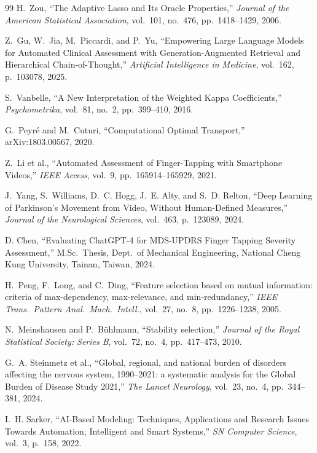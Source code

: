 \documentclass[conference]{IEEEtran}
\begin{document}
\begin{thebibliography}{99}
H.~Zou,
``The Adaptive Lasso and Its Oracle Properties,''
\textit{Journal of the American Statistical Association},
vol.~101, no.~476, pp.~1418--1429, 2006.

Z.~Gu, W.~Jia, M.~Piccardi, and P.~Yu,
``Empowering Large Language Models for Automated Clinical Assessment
with Generation-Augmented Retrieval and Hierarchical Chain-of-Thought,''
\textit{Artificial Intelligence in Medicine}, vol.~162, p.~103078, 2025.

S.~Vanbelle,
``A New Interpretation of the Weighted Kappa Coefficients,''
\textit{Psychometrika}, vol.~81, no.~2, pp.~399--410, 2016.

G.~Peyr\'{e} and M.~Cuturi,
``Computational Optimal Transport,''
arXiv:1803.00567, 2020.

Z.~Li et al.,
``Automated Assessment of Finger-Tapping with Smartphone Videos,''
\textit{IEEE Access}, vol.~9, pp.~165914--165929, 2021.

J.~Yang, S.~Williams, D.~C. Hogg, J.~E. Alty, and S.~D. Relton,
``Deep Learning of Parkinson's Movement from Video, Without
Human-Defined Measures,''
\textit{Journal of the Neurological Sciences}, vol.~463, p.~123089, 2024.

D. Chen,
``Evaluating ChatGPT-4 for MDS-UPDRS Finger Tapping Severity Assessment,''
M.Sc.\ Thesis, Dept.\ of Mechanical Engineering,
National Cheng Kung University, Tainan, Taiwan, 2024.

H.~Peng, F.~Long, and C.~Ding,
``Feature selection based on mutual information: criteria of max-dependency,
max-relevance, and min-redundancy,''
\textit{IEEE Trans.\ Pattern Anal.\ Mach.\ Intell.}, vol.~27, no.~8,
pp.~1226--1238, 2005.

N.~Meinshausen and P.~B\"{u}hlmann,
``Stability selection,''
\textit{Journal of the Royal Statistical Society: Series B}, vol.~72, no.~4,
pp.~417--473, 2010.

G.~A. Steinmetz et al.,
``Global, regional, and national burden of disorders affecting the nervous
system, 1990--2021: a systematic analysis for the Global Burden of Disease
Study 2021,''
\textit{The Lancet Neurology}, vol.~23, no.~4, pp.~344--381, 2024.

I.~H. Sarker,
``AI-Based Modeling: Techniques, Applications and Research Issues
Towards Automation, Intelligent and Smart Systems,''
\textit{SN Computer Science}, vol.~3, p.~158, 2022.


\end{thebibliography}
\end{document}
